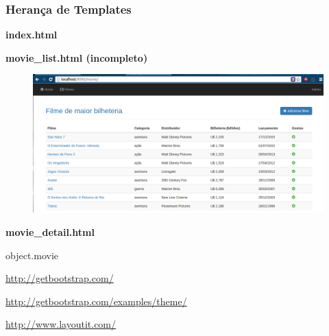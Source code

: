 \documentclass[aspectratio=169]{beamer}
\begin{document}
\begin{frame}[fragile]\frametitle{Heran\c ca de Templates}
 
\textbf{index.html}

 
\end{frame}


\begin{frame}[fragile]
 
\textbf{movie\_list.html (incompleto)}

 
\end{frame}

\begin{frame}
	\begin{figure}[h]
	  \centering
  		\includegraphics[width=.9\paperwidth]{img/lista.png}
	\end{figure}
\end{frame}




\begin{frame}[fragile]

\textbf{movie\_detail.html}

\begin{htmlcode}
{{ object.movie }}
\end{htmlcode}

\vfill

\url{http://getbootstrap.com/}

\url{http://getbootstrap.com/examples/theme/}

\url{http://www.layoutit.com/}

\end{frame}
\end{document}
